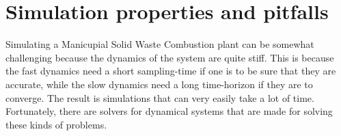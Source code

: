 \section{Simulation properties and pitfalls}

Simulating a Manicupial Solid Waste Combustion plant can be somewhat challenging because the dynamics of the system are quite stiff. This is because the fast dynamics need a short sampling-time if one is to be sure that they are accurate, while the slow dynamics need a long time-horizon if they are to converge. The result is simulations that can very easily take a lot of time. Fortunately, there are solvers for dynamical systems that are made for solving these kinds of problems. 